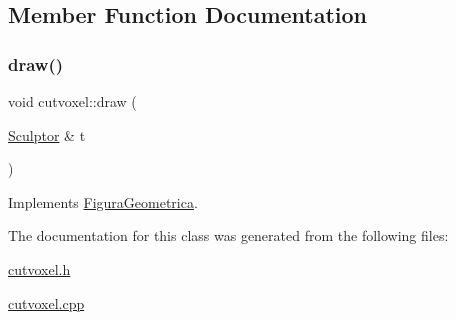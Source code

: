 \subsection{Member Function Documentation}
\mbox{\label{classcutvoxel_a6ef7e4acd616477fe3b07b08b7899d23}} 
\subsubsection{\texorpdfstring{draw()}{draw()}}
{\footnotesize\ttfamily void cutvoxel\+::draw (\begin{DoxyParamCaption}\item[{\mbox{\hyperlink{class_sculptor}{Sculptor}} \&}]{t }\end{DoxyParamCaption})\hspace{0.3cm}{\ttfamily [virtual]}}



Implements \mbox{\hyperlink{class_figura_geometrica_a34585fd7c0bd7378fc69c4ee208e676c}{Figura\+Geometrica}}.



The documentation for this class was generated from the following files\+:\begin{DoxyCompactItemize}
\item 
\mbox{\hyperlink{cutvoxel_8h}{cutvoxel.\+h}}\item 
\mbox{\hyperlink{cutvoxel_8cpp}{cutvoxel.\+cpp}}\end{DoxyCompactItemize}
